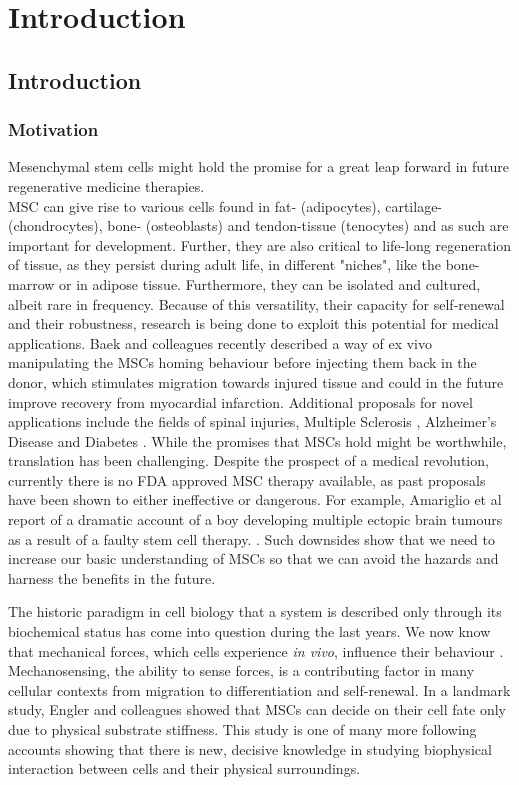
\chapter{Introduction}

\section{Introduction}
\subsection{Motivation}
\label{sec:motivation}
Mesenchymal stem cells might hold the promise for a great leap forward in future regenerative medicine therapies. \\
MSC can give rise to various cells found in fat- (adipocytes), cartilage- (chondrocytes), bone- (osteoblasts) and tendon-tissue (tenocytes) \cite{Barlow2008, Hass2011} and as such are important for development.
Further, they are also critical to life-long regeneration of tissue, as they persist during adult life, in different "niches", like the bone-marrow or in adipose tissue. Furthermore, they can be isolated and cultured, albeit rare in frequency. Because of this versatility, their capacity for self-renewal and their robustness, research is being done to exploit this potential for medical applications. Baek and colleagues recently described a way of ex vivo manipulating the MSCs homing behaviour before injecting them back in the donor, which stimulates migration towards injured tissue and could in the future improve recovery from myocardial infarction. \cite{Baek2011}  Additional proposals for novel applications include the fields of spinal injuries\cite{Goldschlager2010}, Multiple Sclerosis \cite{Planchon2018}, Alzheimer's Disease \cite{Han2018, Hao2012} and Diabetes \cite{Evangelista2018}.  While the promises that MSCs hold might be worthwhile, translation has been challenging. Despite the prospect of a medical revolution, currently there is no FDA approved MSC therapy available, as past proposals have been shown to either ineffective or dangerous. For example, Amariglio et al report of a dramatic account of a boy developing multiple ectopic brain tumours as a result of a faulty stem cell therapy. \cite{Amariglio2009}. Such downsides show that we need to increase our basic understanding of MSCs so that we can avoid the hazards and harness the benefits in the future.\par

The historic paradigm in cell biology that a system is described only through its biochemical status has come into question during the last years. We now know that mechanical forces, which cells experience \textit{in vivo}, influence their behaviour \cite{Hao2015}. Mechanosensing, the ability to sense forces, is a contributing factor in many cellular contexts from migration to differentiation and self-renewal. In a landmark study, Engler and colleagues\cite{Engler2006} showed that MSCs can decide on their cell fate only due to physical substrate stiffness. This study is one of many more following accounts showing that there is new, decisive knowledge in studying biophysical interaction between cells and their physical surroundings.\par

